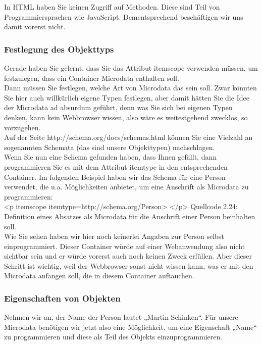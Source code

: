 In HTML haben Sie keinen Zugriff auf Methoden. Diese sind Teil von Programmiersprachen wie JavaScript. Dementsprechend beschäftigen wir uns damit vorerst nicht.

\subsubsection{Festlegung des Objekttyps}

Gerade haben Sie gelernt, dass Sie das Attribut itemscope verwenden müssen, um festzulegen, dass ein Container Microdata enthalten soll.\\

Dann müssen Sie festlegen, welche Art von Microdata das sein soll. Zwar könnten Sie hier auch willkürlich eigene Typen festlegen, aber damit hätten Sie die Idee der Microdata ad absurdum geführt, denn was Sie sich bei eigenen Typen denken, kann kein Webbrowser wissen, also wäre es weitestgehend zwecklos, so vorzugehen.\\

Auf der Seite
http://schema.org/docs/schemas.html 
können Sie eine Vielzahl an sogenannten Schemata (das sind unsere Objekttypen) nachschlagen.\\

Wenn Sie nun eine Schema gefunden haben, dass Ihnen gefällt, dann programmieren Sie es mit dem Attribut itemtype in den entsprechenden Container. Im folgenden Beispiel haben wir das Schema für eine Person verwendet, die u.a. Möglichkeiten anbietet, um eine Anschrift als Microdata zu programmieren:\\

<p itemscope itemtype=http://schema.org/Person>
</p>
Quellcode 2.24: Definition eines Absatzes als Microdata für die Anschrift einer Person beinhalten soll.\\

Wie Sie sehen haben wir hier noch keinerlei Angaben zur Person selbst einprogrammiert. Dieser Container würde auf einer Webanwendung also nicht sichtbar sein und er würde vorerst auch noch keinen Zweck erfüllen. Aber dieser Schritt ist wichtig, weil der Webbrowser sonst nicht wissen kann, was er mit den Microdata anfangen soll, die in diesem Container auftauchen.

\subsubsection{Eigenschaften von Objekten}

Nehmen wir an, der Name der Person lautet „Martin Schinken“. Für unsere Microdata benötigen wir jetzt also eine Möglichkeit, um eine Eigenschaft „Name“ zu programmieren und diese als Teil des Objekts einzuprogrammieren.\\


